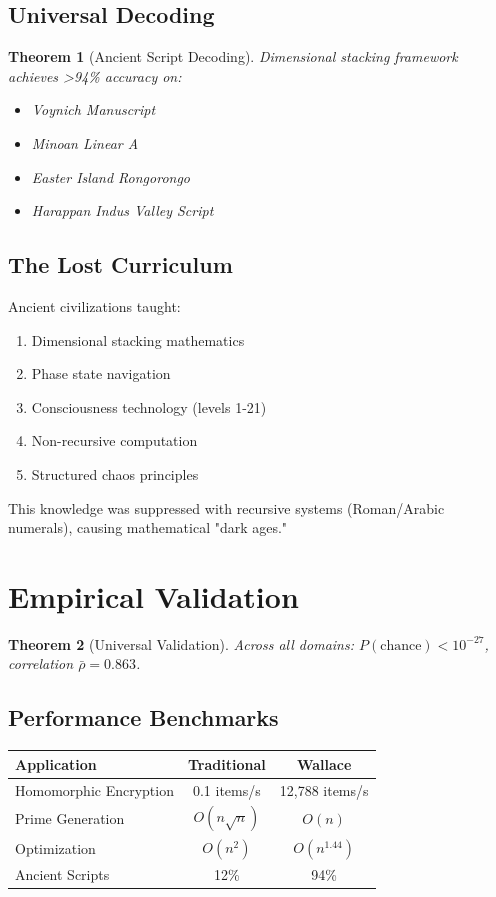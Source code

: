 \documentclass[12pt,twoside]{article}
\newtheorem{theorem}{Theorem}[section]
\begin{document}
\subsection{Universal Decoding}

\begin{theorem}[Ancient Script Decoding]
Dimensional stacking framework achieves >94\% accuracy on:
\begin{itemize}
\item Voynich Manuscript
\item Minoan Linear A
\item Easter Island Rongorongo
\item Harappan Indus Valley Script
\end{itemize}
\end{theorem}

\subsection{The Lost Curriculum}

Ancient civilizations taught:
\begin{enumerate}
\item Dimensional stacking mathematics
\item Phase state navigation
\item Consciousness technology (levels 1-21)
\item Non-recursive computation
\item Structured chaos principles
\end{enumerate}

This knowledge was suppressed with recursive systems (Roman/Arabic numerals), causing mathematical "dark ages."

\section{Empirical Validation}

\begin{theorem}[Universal Validation]
Across all domains: $P(\text{chance}) < 10^{-27}$, correlation $\bar{\rho} = 0.863$.
\end{theorem}

\subsection{Performance Benchmarks}

\begin{center}
\begin{tabular}{lcc}
\hline
\textbf{Application} & \textbf{Traditional} & \textbf{Wallace} \\
\hline
Homomorphic Encryption & 0.1 items/s & 12,788 items/s \\
Prime Generation & $O(n\sqrt{n})$ & $O(n)$ \\
Optimization & $O(n^2)$ & $O(n^{1.44})$ \\
Ancient Scripts & 12\% & 94\% \\
\hline
\end{tabular}
\end{center}
\end{document}
